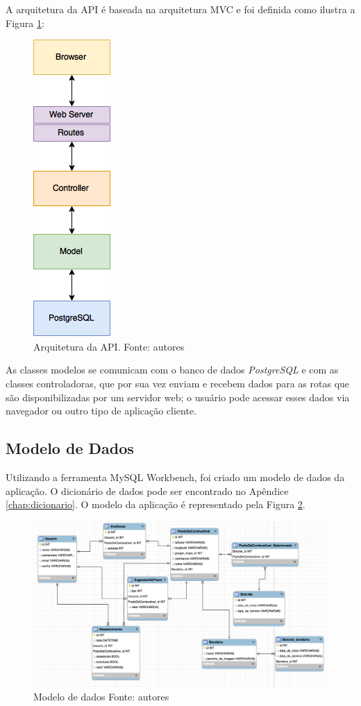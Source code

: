 A arquitetura da API é baseada na arquitetura MVC e foi definida como ilustra a Figura \ref{img:arquitetura}:

\begin{figure}[H]
    \centering
    \includegraphics[scale=0.5]{figuras/api_arch.png}
    \caption[Arquitetura da API]{Arquitetura da API. Fonte: autores}
    \label{img:arquitetura}
\end{figure}

As classes modelos se comunicam com o banco de dados \textit{PostgreSQL} e com as classes controladoras, que por sua vez enviam e recebem dados para as rotas que são disponibilizadas por um servidor web; o usuário pode acessar esses dados via navegador ou outro tipo de aplicação cliente.

\subsection{Modelo de Dados}

Utilizando a ferramenta MySQL Workbench, foi criado um modelo de dados da aplicação. O dicionário de dados pode ser encontrado no Apêndice \ref{chap:dicionario}. O modelo da aplicação é representado pela Figura \ref{img:modelo_de_dados}.

\begin{figure}[H]
    \centering
    \includegraphics[scale=0.5]{figuras/modelagem_traduzida.png}
    \caption[Modelo de dados]{Modelo de dados Fonte: autores}
    \label{img:modelo_de_dados}
\end{figure}
